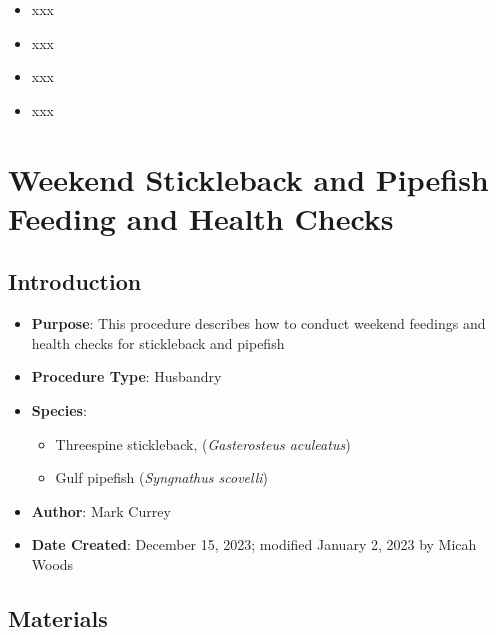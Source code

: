 \documentclass[
  letterpaper,
  DIV=11,
  numbers=noendperiod]{scrreprt}
\providecommand{\tightlist}{%
  \setlength{\itemsep}{0pt}\setlength{\parskip}{0pt}}\usepackage{longtable,booktabs,array}
\begin{document}
\begin{itemize}
\tightlist
\item
  xxx
\item
  xxx
\item
  xxx
\item
  xxx
\end{itemize}

\hypertarget{sec-husbandry-weekend_feeding}{%
\chapter{Weekend Stickleback and Pipefish Feeding and Health
Checks}\label{sec-husbandry-weekend_feeding}}

\hypertarget{introduction-47}{%
\section{Introduction}\label{introduction-47}}

\begin{itemize}
\tightlist
\item
  \textbf{Purpose}: This procedure describes how to conduct weekend
  feedings and health checks for stickleback and pipefish
\item
  \textbf{Procedure Type}: Husbandry
\item
  \textbf{Species}:

  \begin{itemize}
  \tightlist
  \item
    Threespine stickleback, (\emph{Gasterosteus aculeatus})
  \item
    Gulf pipefish (\emph{Syngnathus scovelli})
  \end{itemize}
\item
  \textbf{Author}: Mark Currey
\item
  \textbf{Date Created}: December 15, 2023; modified January 2, 2023 by
  Micah Woods
\end{itemize}

\hypertarget{materials-45}{%
\section{Materials}\label{materials-45}}
\end{document}
